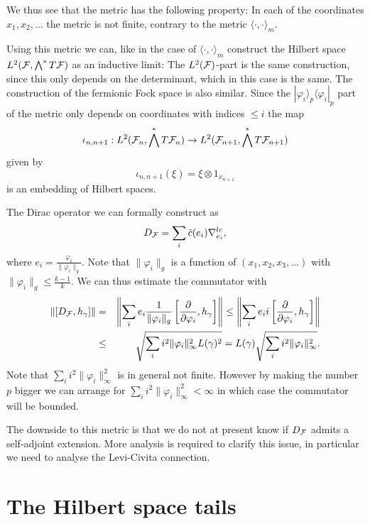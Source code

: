 \documentclass[letterpaper,12pt]{article}
\def\cf{{\cal F}}
\newcommand{\cF}{{\cal F}}
\begin{document}
We thus see that the metric has the following property: In each of the coordinates $x_1,x_2,\ldots$ the metric is not finite, contrary to the metric $\langle \cdot , \cdot \rangle_{m}$. 

Using this metric we can, like in the case of $\langle \cdot , \cdot \rangle_{m}$ construct the Hilbert space $L^2(\cF,\bigwedge^* T\cf )$ as an inductive limit: The $L^2(\cf)$-part is the same construction, since this only depends on the determinant, which in this case is the same.  The construction of the fermionic Fock space is also similar. Since the $|\varphi_i\rangle_p \langle \varphi_i|_p$ part of the metric only depends on coordinates with indices $\leq i$ the map 
$$\iota_{n,n+1}:L^2 (\cf_n , \bigwedge^* T\cf_n) \to L^2 (\cf_{n+1} , \bigwedge^* T\cf_{n+1})  $$
  given by
  $$ \iota_{n,n+1} (\xi)=\xi\otimes 1_{x_{n+1}}$$
  is an embedding of Hilbert spaces.

The Dirac operator we can formally construct as 
$$D_\cf=\sum_{i} \bar{c}(e_i)\nabla_{e_i}^{lc}    ,$$
where $e_i =\frac{\varphi_i}{\|\varphi_i\|_g}$. Note that $\|\varphi_i\|_g$ is a function of  $(x_1,x_2,x_3,\ldots)$ with $\|\varphi_i\|_g\leq \frac{k-1}{k}$. We can thus estimate the commutator with 
\begin{eqnarray*}
\left\|  [D_\cf,h_\gamma ]  \right\| &=& \left\|  \sum_i e_i    \frac{1}{\|\varphi_i \|_g}\left[  \frac{\partial}{\partial \varphi_i},h_\gamma \right]  \right\| \leq  \left\|  \sum_i e_i     i\left[  \frac{\partial}{\partial \varphi_i},h_\gamma \right]  \right\| \\
& \leq & \sqrt{ \sum_i   i^2    \| \varphi_i\|_\infty^2L(\gamma)^2} = L(\gamma)\sqrt{ \sum_i   i^2     \| \varphi_i\|_\infty^2} .
\end{eqnarray*}
Note that $\sum_i   i^2     \| \varphi_i\|_\infty^2$ is in general not finite. However by making the  number $p$ bigger we can arrange for $\sum_i   i^2     \| \varphi_i\|_\infty^2 <\infty$ in which case the commutator will be bounded.

The downside to this metric is that we do not at present know if $D_\cf$ admits a self-adjoint extension. More analysis is required to clarify this issue, in particular we need to analyse the Levi-Civita connection. 






\section{The Hilbert space tails}
\end{document}
